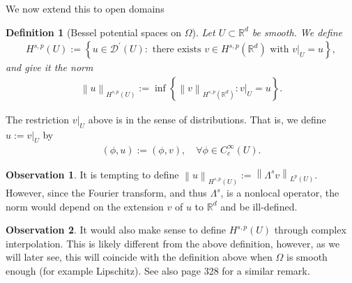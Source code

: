 \documentclass[
    a4paper,
    DIV=14,
    abstract=true,
    numbers=noenddot
]
{scrartcl}
\newtheorem{definition}[theorem]{Definition}
\theoremstyle{definition}
\newtheorem{observation}{Observation}
\newcommand{\set}[1]{\left\{#1\right\}}
\renewcommand{\norm}[1]{\left\lVert #1 \right\rVert}\renewcommand{\abs}[1]{\left| #1 \right|}
\newcommand\restr[2]{\left.#1\right|_{#2}}
\newcommand{\R}{\mathbb{R}}
\begin{document}
We now extend this to open domains
\begin{definition}[Bessel potential spaces on $\Omega $]\label{bessel potential def Omega}
    Let $U  \subset \R^d$ be smooth. We define
    \begin{align*}
        H^{s,p}(U ):=\left\{u \in \mathcal{D}^{\prime}(U ): \text{ there exists } v \in H^{s,p}(\R^d) \text{ with } \restr{v}{U }=u\right\},
    \end{align*}
    and give it the norm
    \begin{align*}
        \norm{u}_{H^{s,p}(U )}:= \inf \set{\norm{v}_{H^{s,p}(\R^d)}: \restr{v}{U }=u}.
    \end{align*}
\end{definition}
The restriction $\restr{v}{U }$  above is in the sense of distributions. That is, we define $u:=\restr{v}{U }$ by
\begin{align*}
    (\phi,u):=(\phi,v), \quad \forall \phi \in C_c^\infty(U ).
\end{align*}
\begin{observation}
    It is tempting to define $\norm{u}_{H^{s,p}(U )}:=\norm{\Lambda^s v}_{L^p(U )}$. However, since the Fourier transform, and thus $\Lambda^s$, is a nonlocal operator, the norm would depend on the extension $v$  of $u$ to $\R^d$ and be ill-defined.
\end{observation}
\begin{observation}
    It would also make sense to define $H^{s,p}(U )$  through complex interpolation. This is likely different from the above definition, however, as we will later see, this will coincide with the definition above when $\Omega $ is smooth enough (for example Lipschitz). See also \cite{leoni2023first} page 328 for a similar remark.
\end{observation}
\end{document}
